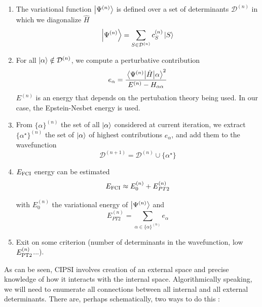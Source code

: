 \documentclass[./thesis.tex]{subfiles}
\begin{document}
\begin{enumerate}
\item

The variational function $\ket {\Psi^{(n)}}$ is defined over a set of determinants $  \mathcal{D}^{(n)}$ in which we diagonalize $\widehat{H}$
\begin{equation}
\ket{\Psi^{(n)}} = \sum_{S \in \mathcal{D}^{(n)}} c_S^{(n)} \ket{S}
\end{equation}

\item
For all ${\ket{\alpha}} \notin \mathcal{D}^{(n)}$, we compute a perturbative contribution
\begin{equation}
e_\alpha = \frac{\mel{\Psi^{(n)}}{\hat{H}}{\alpha}^2}{E^{(n)} - H_{\alpha \alpha}}
\end{equation}
$E^{(n)}$ is an energy that depends on the pertubation theory being used. In our case, the Epstein-Nesbet energy is used.

\item
From $\{ \alpha \}^{(n)}$ the set of all ${\ket{\alpha}}$ considered at current iteration, we extract $\{ \alpha^\star \}^{(n)}$ the set of ${\ket{\alpha}}$ of highest contributions $e_\alpha$, and add them to the wavefunction
\begin{equation}
\mathcal{D}^{(n+1)} = \mathcal{D}^{(n)} \cup \{ \alpha^\star \}
\end{equation}

\item
$E_\text{FCI}$ energy can be estimated
\begin{equation}
E_\text{FCI} \approx E^{(n)}_0 + E_{PT2}^{(n)}
\end{equation}


with $E^{(n)}_0$ the variational energy of $\ket {\Psi^{(n)}}$ and
\begin{equation}
E_{PT2}^{(n)} = \sum_{\alpha \in \{\alpha \}^{(n)}} e_\alpha
\end{equation}
\item
Exit on some criterion (number of determinants in the wavefunction, low $E_\text{PT2}^{(n)}$...).

\end{enumerate}



As can be seen, CIPSI involves creation of an external space and precise knowledge of how it interacts with the internal space. Algorithmically speaking, we will need to enumerate all connections between all internal and all external determinants.
There are, perhaps schematically, two ways to do this :
\end{document}

